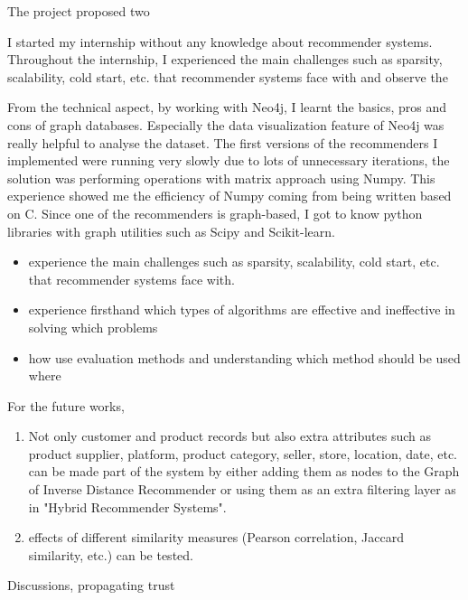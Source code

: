 The project proposed two 

I started my internship without any knowledge about recommender systems. Throughout the internship, I experienced the main challenges such as sparsity, scalability, cold start, etc. that recommender systems face with and observe the 

From the technical aspect, by working with Neo4j, I learnt the basics, pros and cons of graph databases. Especially the data visualization feature of Neo4j was really helpful to analyse the dataset. The first versions of the recommenders I implemented were running very slowly due to lots of unnecessary iterations, the solution was performing operations with matrix approach using Numpy. This experience showed me the efficiency of Numpy coming from being written based on C. Since one of the recommenders is graph-based, I got to know python libraries with graph utilities such as Scipy and Scikit-learn.

\begin{itemize}
	\item experience the main challenges such as sparsity, scalability, cold start, etc. that recommender systems face with.
	\item experience firsthand which types of algorithms are effective and ineffective in solving which problems 
	\item how use evaluation methods and understanding which method should be used where
\end{itemize}
For the future works,
\begin{enumerate}
	\item Not only customer and product records but also extra attributes such as product supplier, platform, product category, seller, store, location, date, etc. can be made part of the system by either adding them as nodes to the Graph of Inverse Distance Recommender or using them as an extra filtering layer as in "Hybrid Recommender Systems".
	\item effects of different similarity measures (Pearson correlation, Jaccard similarity, etc.) can be tested.
\end{enumerate}
Discussions, propagating trust